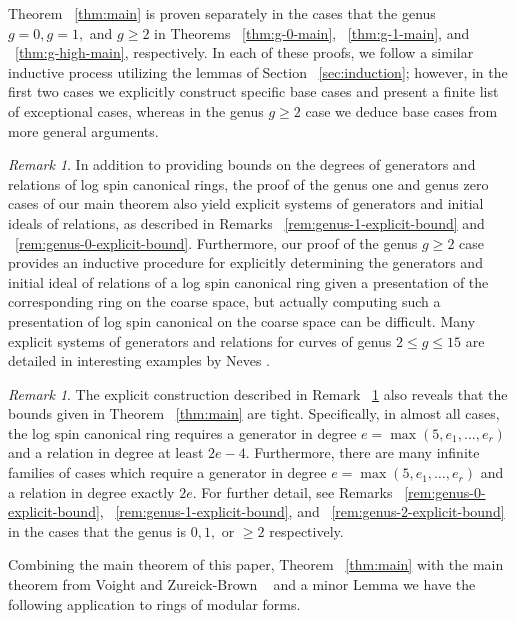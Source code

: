 \documentclass{amsart}
\theoremstyle{plain}
\theoremstyle{definition}
\theoremstyle{remark}
\newtheorem{rem}[thm]{Remark}
\numberwithin{equation}{section}
\begin{document}
Theorem ~\ref{thm:main} is proven separately in the cases that the genus $g = 0, g = 1,$ and $g \geq 2$ in Theorems ~\ref{thm:g-0-main}, ~\ref{thm:g-1-main}, and ~\ref{thm:g-high-main}, respectively.  In each of these proofs, we follow a similar inductive process utilizing the lemmas of Section ~\ref{sec:induction}; however, in the first two cases we explicitly construct specific base cases and present a finite list of exceptional cases, whereas in the genus $g \geq 2$ case we deduce base cases from more general arguments.
\begin{rem}
\label{rem:explicit-generators}
In addition to providing bounds on the degrees of generators and relations of log spin canonical rings, the proof
of the genus one and genus zero cases of our main theorem also yield explicit systems
of generators and initial ideals of relations, as described in Remarks ~\ref{rem:genus-1-explicit-bound} and ~\ref{rem:genus-0-explicit-bound}.
Furthermore, our proof of the genus $g \geq 2$ case provides
an inductive procedure for explicitly determining the generators
and initial ideal of relations of a log spin canonical ring given a presentation of the corresponding ring on the coarse space, but actually computing such a presentation of log spin canonical on the coarse space can be difficult.  Many
explicit systems of generators and relations for curves of genus $2
\leq g \leq 15$ are detailed in interesting examples by Neves
\cite[Section III.4]{neves:halfcan}. 
\end{rem}
\begin{rem}
The explicit construction described in Remark ~\ref{rem:explicit-generators} also reveals that the bounds given in Theorem ~\ref{thm:main} are tight.
Specifically, in almost all cases, the log spin canonical ring requires a generator in degree $e = \max(5, e_1, \ldots, e_r)$ and a relation in degree at least $2e-4$. 
Furthermore, there are many infinite families of cases which require a generator in degree $e = \max(5, e_1, \ldots, e_r)$ and a relation in degree exactly $2e$. For further detail, see Remarks ~\ref{rem:genus-0-explicit-bound}, ~\ref{rem:genus-1-explicit-bound}, and ~\ref{rem:genus-2-explicit-bound} in the cases that the genus is $0,1,$ or $\geq 2$ respectively.
\end{rem}

Combining the main theorem of this paper, Theorem ~\ref{thm:main} with the main theorem from Voight and Zureick-Brown ~\cite
[Theorem 1.4]{vzb:stacky} and a minor Lemma \cite[Lemma 10.2.1]{vzb:stacky}
we have the following application to
rings of modular forms.
\end{document}
